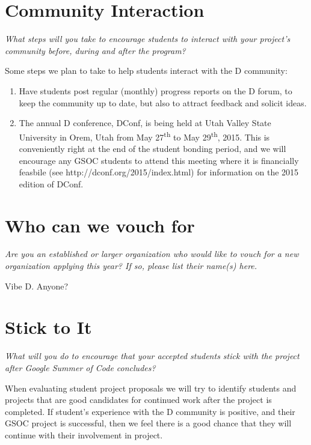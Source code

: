 \documentclass[a4paper,12pt]{article}
\begin{document}
\section{Community Interaction}
\emph{What steps will you take to encourage students to interact 
with your project's community before, during and after 
the program?}

Some steps we plan to take to help students interact with
the D community:

\begin{enumerate}
\item Have students post regular (monthly) progress reports
on the D forum, to keep the community up to date, but also
to attract feedback and solicit ideas.
\item The annual D conference, DConf, is being held at Utah
Valley State University in Orem, Utah from May 27\textsuperscript{th}
to May 29\textsuperscript{th}, 2015. This is conveniently right at 
the end of the student bonding period, and we will encourage any
GSOC students to attend this meeting where it is financially 
feasbile (see http://dconf.org/2015/index.html) for information on 
the 2015 edition of DConf.
\end{enumerate}

\section{Who can we vouch for}
\emph{Are you an established or larger organization who would like to 
vouch for a new organization applying this year? If so, please 
list their name(s) here.}

Vibe D.   Anyone?

\section{Stick to It}
\emph{What will you do to encourage that your accepted students stick 
with the project after Google Summer of Code concludes?}

When evaluating student project proposals we will try to identify
students and projects that are good candidates for continued work
after the project is completed.  If student's experience with the 
D community is positive, and their GSOC project is successful, then
we feel there is a good chance that they will continue with their
involvement in project. 
\end{document}
